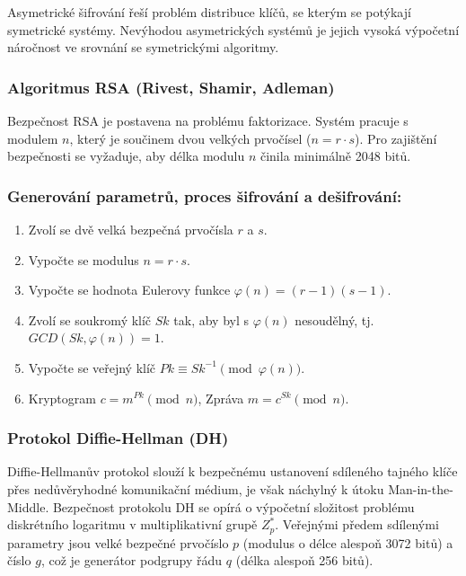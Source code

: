                 Asymetrické šifrování řeší problém distribuce klíčů, se kterým se potýkají symetrické systémy. Nevýhodou asymetrických systémů je jejich vysoká výpočetní náročnost ve srovnání se symetrickými algoritmy.
                \subsubsection{Algoritmus RSA (Rivest, Shamir, Adleman)}
                    Bezpečnost RSA je postavena na problému faktorizace. Systém pracuje s modulem $n$, který je součinem dvou velkých prvočísel ($n = r \cdot s$). Pro zajištění bezpečnosti se vyžaduje, aby délka modulu $n$ činila minimálně 2048 bitů.
                    \subsubsection*{Generování parametrů, proces šifrování a dešifrování:}
                        \begin{enumerate}
                            \item Zvolí se dvě velká bezpečná prvočísla $r$ a $s$.
                            \item Vypočte se modulus $n = r \cdot s$.
                            \item Vypočte se hodnota Eulerovy funkce $\varphi(n) = (r - 1)(s - 1)$.
                            \item Zvolí se soukromý klíč $Sk$ tak, aby byl s $\varphi(n)$ nesoudělný, tj. $GCD(Sk, \varphi(n)) = 1$.
                            \item Vypočte se veřejný klíč $Pk \equiv Sk^{-1} \pmod{\varphi(n)}$.
                            \item Kryptogram $c = m^{Pk} \pmod{n}$, Zpráva $m = c^{Sk} \pmod{n}$.
                        \end{enumerate}
                \subsubsection{Protokol Diffie-Hellman (DH)}
                    Diffie-Hellmanův protokol slouží k bezpečnému ustanovení sdíleného tajného klíče přes nedůvěryhodné komunikační médium, je však náchylný k útoku Man-in-the-Middle. Bezpečnost protokolu DH se opírá o výpočetní složitost problému diskrétního logaritmu v multiplikativní grupě ${Z}_p^*$. Veřejnými předem sdílenými parametry jsou velké bezpečné prvočíslo $p$ (modulus o délce alespoň 3072 bitů) a číslo $g$, což je generátor podgrupy řádu $q$ (délka alespoň 256 bitů).

